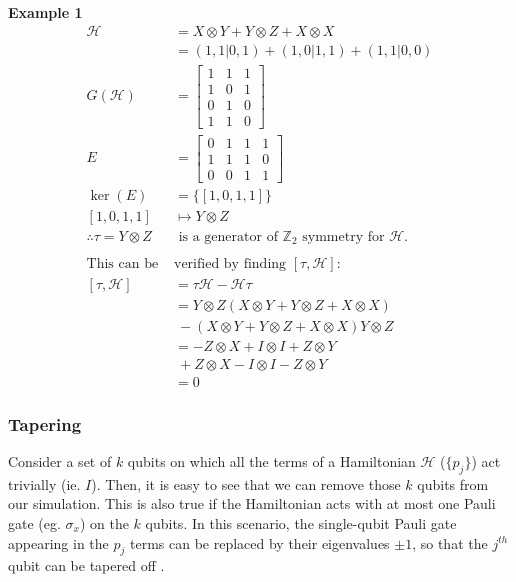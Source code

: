 \documentclass{article}
\newcommand{\ham}{\mathcal{H}}
\newcommand{\zsym}{\mathbb{Z}_2}
\renewcommand{\th}[1]{#1^{th}}
\begin{document}
\begin{framed}\label{z2example}
\textbf{Example 1}
\begin{align*}
    \ham &= X\otimes Y + Y \otimes Z + X \otimes X\\
    &= (1, 1 | 0, 1) + (1, 0 | 1, 1) + (1, 1 | 0, 0)\\
    G(\ham) &= \begin{bmatrix}
    1 & 1 & 1\\
    1 & 0 & 1\\
    0 & 1 & 0\\
    1 & 1 & 0
    \end{bmatrix}\\
    E &= \begin{bmatrix} 
    0 & 1 & 1 & 1\\
    1 & 1 & 1 & 0\\
    0 & 0 & 1 & 1
    \end{bmatrix}\\
    \ker(E) &= \{[1, 0, 1, 1]\}\\
    [1, 0, 1, 1] &\mapsto Y \otimes Z\\
    \therefore \tau = Y \otimes Z &\text{ is a generator of $\zsym$ symmetry for $\ham$}.\\\\
    \text{This can be } & \text{verified by finding $[\tau, \ham]$}:\\
    [\tau, \ham] &= \tau \ham - \ham \tau\\
    &= Y \otimes Z (X\otimes Y + Y \otimes Z + X \otimes X) \\&~- (X\otimes Y + Y \otimes Z + X \otimes X) Y \otimes Z\\
    &= -Z \otimes X + I \otimes I + Z \otimes Y \\&~+ Z \otimes X - I \otimes I - Z \otimes Y\\
    &=0
\end{align*}
\end{framed}

\subsubsection{Tapering}

Consider a set of $k$ qubits on which all the terms of a Hamiltonian $\ham$ ($\{p_j\}$) act trivially (ie. $I$). Then, it is easy to see that we can remove those $k$ qubits from our simulation. This is also true if the Hamiltonian acts with at most one Pauli gate (eg. $\sigma_x$) on the $k$ qubits. In this scenario, the single-qubit Pauli gate appearing in the $p_j$ terms can be replaced by their eigenvalues $\pm 1$, so that the $\th{j}$ qubit can be tapered off \cite{setiaReducingQubitRequirements2020}.
\end{document}
